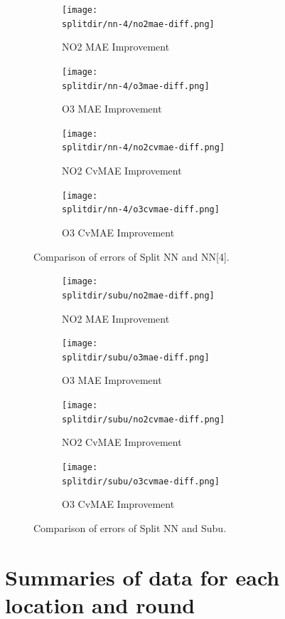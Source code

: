 \documentclass[journal abbreviation, manuscript]{copernicus}
\begin{document}
\begin{figure}[H]
\begin{subfigure}{0.49\textwidth}
\texttt{[image: \\splitdir/nn-4/no2mae-diff.png]}
\caption{NO2 MAE Improvement}
\end{subfigure}
\begin{subfigure}{0.49\textwidth}
\texttt{[image: \\splitdir/nn-4/o3mae-diff.png]}
\caption{O3 MAE Improvement}
\end{subfigure}
\begin{subfigure}{0.49\textwidth}
\texttt{[image: \\splitdir/nn-4/no2cvmae-diff.png]}
\caption{NO2 CvMAE Improvement}
\end{subfigure}
\begin{subfigure}{0.49\textwidth}
\texttt{[image: \\splitdir/nn-4/o3cvmae-diff.png]}
\caption{O3 CvMAE Improvement}
\end{subfigure}
\caption{Comparison of errors of Split NN and NN[4].}
\end{figure}

\begin{figure}[H]
\begin{subfigure}{0.49\textwidth}
\texttt{[image: \\splitdir/subu/no2mae-diff.png]}
\caption{NO2 MAE Improvement}
\end{subfigure}
\begin{subfigure}{0.49\textwidth}
\texttt{[image: \\splitdir/subu/o3mae-diff.png]}
\caption{O3 MAE Improvement}
\end{subfigure}
\begin{subfigure}{0.49\textwidth}
\texttt{[image: \\splitdir/subu/no2cvmae-diff.png]}
\caption{NO2 CvMAE Improvement}
\end{subfigure}
\begin{subfigure}{0.49\textwidth}
\texttt{[image: \\splitdir/subu/o3cvmae-diff.png]}
\caption{O3 CvMAE Improvement}
\end{subfigure}
\caption{Comparison of errors of Split NN and Subu.}
\end{figure}

\renewcommand{\thetable}{\Alph{section}.\arabic{table}}

\section{Summaries of data for each location and round}
\label{sec:summaryresults}
\end{document}
